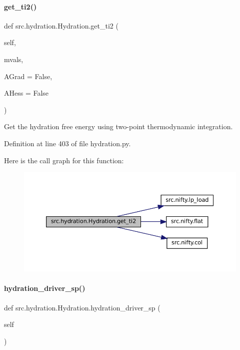 \paragraph{\texorpdfstring{get\+\_\+ti2()}{get\_ti2()}}
{\footnotesize\ttfamily def src.\+hydration.\+Hydration.\+get\+\_\+ti2 (\begin{DoxyParamCaption}\item[{}]{self,  }\item[{}]{mvals,  }\item[{}]{A\+Grad = {\ttfamily False},  }\item[{}]{A\+Hess = {\ttfamily False} }\end{DoxyParamCaption})}



Get the hydration free energy using two-\/point thermodynamic integration. 



Definition at line 403 of file hydration.\+py.

Here is the call graph for this function\+:
\nopagebreak
\begin{figure}[H]
\begin{center}
\leavevmode
\includegraphics[width=350pt]{classsrc_1_1hydration_1_1Hydration_a38cd994b0a967cae32096b80c4e630a9_cgraph}
\end{center}
\end{figure}
\mbox{\label{classsrc_1_1hydration_1_1Hydration_a5de8c3c6f83356cacbaf95c8514f1eb1}} 
\paragraph{\texorpdfstring{hydration\+\_\+driver\+\_\+sp()}{hydration\_driver\_sp()}}
{\footnotesize\ttfamily def src.\+hydration.\+Hydration.\+hydration\+\_\+driver\+\_\+sp (\begin{DoxyParamCaption}\item[{}]{self }\end{DoxyParamCaption})}



